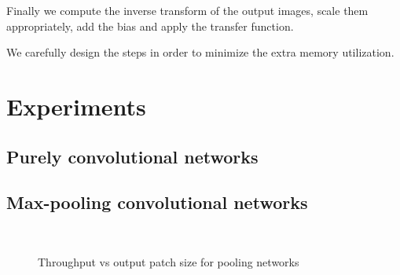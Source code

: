 \documentclass[conference]{IEEEtran}
\begin{document}
Finally we compute the inverse transform of the output images, scale
them appropriately, add the bias and apply the transfer function.

We carefully design the steps in order to minimize the extra memory
utilization.


\section{Experiments}

\subsection{Purely convolutional networks}
\subsection{Max-pooling convolutional networks}


\begin{figure}[h!t]
  \centering
    \\

  \caption{Throughput vs output patch size for pooling networks
  }
  \label{fig:2dspeedups_threads}
\end{figure}
\end{document}
